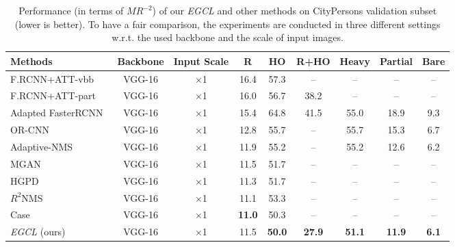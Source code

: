 \documentclass[journal]{IEEEtran}
\begin{document}
\begin{table*}[!t]

\centering
\caption{Performance (in terms of $MR^{-2}$) of our \emph{EGCL} and other methods on CityPersons validation subset (lower is better). To have a fair comparison, the experiments are conducted in three different settings w.r.t. the used backbone and the scale of input images.}
\renewcommand\arraystretch{1.5} 
\begin{tabular}{l| c c c c c c c c}
\toprule
\multicolumn{1}{l|}{Methods} &\multicolumn{1}{c}{Backbone} &\multicolumn{1}{c}{Input Scale} &\multicolumn{1}{c}{\textbf{R}}& \multicolumn{1}{c}{\textbf{HO}}  & \multicolumn{1}{c}{\textbf{R+HO}} & \multicolumn{1}{c}{\textbf{Heavy}} & \multicolumn{1}{c}{\textbf{Partial}} & \multicolumn{1}{c}{\textbf{Bare}}\\
\midrule
F.RCNN+ATT-vbb~\cite{zhang2018occluded}  & VGG-16 & ×1 &  16.4   &  57.3     &   --  & -- & -- & -- \\
F.RCNN+ATT-part~\cite{zhang2018occluded}  & VGG-16 & ×1 &  16.0   &  56.7     &   38.2  & -- & -- & -- \\
Adapted FasterRCNN~\cite{zhang2017citypersons}  & VGG-16        & ×1          &  15.4                                &     64.8                             &   41.5      & 55.0 &18.9 &  9.3                            \\ 
OR-CNN~\cite{zhang2018occlusion} & VGG-16           & ×1        &  12.8   &    55.7     &   --   & 55.7 & 15.3 &  6.7                            \\ 
Adaptive-NMS~\cite{liu2019adaptive} & VGG-16   & ×1        &   11.9         &        55.2        &  --      & 55.2 &12.6 & 6.2                              \\ 
MGAN~\cite{pang2019mask} & VGG-16   & ×1        &   11.5         &        51.7        &  --      & -- &-- & --                             \\ 
HGPD~\cite{li2020learning} & VGG-16   & ×1        &   11.3         &        51.7        &  --      & -- &-- & --                             \\
$R^{2}$NMS~\cite{huang2020nms} & VGG-16   & ×1        &   11.1         &        53.3      &  --      & -- &-- & --                             \\
Case~\cite{xie2020count} & VGG-16   & ×1        &   \textbf{11.0}         &        50.3      &  --      &  --      & --      &  --                                 \\
\emph{EGCL} (ours) & VGG-16  & ×1        & 11.5                                 &  \textbf{50.0}                                &   \textbf{27.9}      & \textbf{51.1}& \textbf{11.9} &  \textbf{6.1}  \\

\end{tabular}
\end{table*}
\end{document}
